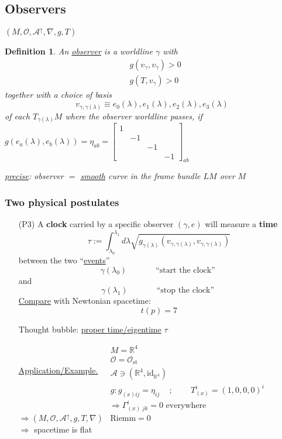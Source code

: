 \documentclass[10pt, twoside]{amsart}
\newtheorem{definition}{Definition}
\begin{document}
\begin{multicols*}{2}
\subsection{Observers} $(M,\mathcal{O}, \mathcal{A}^{\uparrow},\nabla ,g, T)$
\begin{definition}
  An \underline{observer} is a worldline $\gamma$ with
\[
\begin{aligned}
  & g(v_{\gamma}, v_{\gamma}) >  0 \\ 
  & g(T,v_{\gamma}) > 0 
\end{aligned}
\]
together with a choice of basis
\[
v_{\gamma,\gamma(\lambda)} \equiv e_0(\lambda) , e_1(\lambda), e_2(\lambda), e_3(\lambda)
\]
of each $T_{\gamma(\lambda)}M$ where the observer worldline passes, if $g(e_a(\lambda), e_b(\lambda)) = \eta_{ab} = \left[ \begin{matrix} 1 & & & \\ & -1 & & \\ & & -1 & \\ & & & -1 \end{matrix} \right]_{ab}$

\underline{precise}: observer $=$ \underline{smooth} curve in the frame bundle $LM$ over $M$
\end{definition}

\subsubsection{Two physical postulates}

\begin{enumerate}
  \item[(P3)] A \textbf{clock} carried by a specific observer $(\gamma, e)$ will measure a \textbf{time}
\[
\tau := \int_{\lambda_0}^{\lambda_1} d\lambda \sqrt{ g_{\gamma(\lambda)}(v_{\gamma,\gamma(\lambda)}, v_{\gamma,\gamma(\lambda)}) }
\]
between the two ``\underline{events}''
\[
\gamma(\lambda_0) \quad \quad \quad \, \text{ ``start the clock'' }
\]
and 
\[
\gamma(\lambda_1) \quad \quad \quad \, \text{ ``stop the clock'' }
\]
\underline{Compare} with Newtonian spacetime:
\[
t(p)=7
\]

Thought bubble: \underline{proper time/eigentime} $\tau$

\underline{Application/Example.}
$\begin{aligned}
& M = \mathbb{R}^4 \\ 
 & \mathcal{O} = \mathcal{O}_{\text{st}} \\
  & \mathcal{A} \ni (\mathbb{R}^4, \text{id}_{\mathbb{R}^4} ) \\ 
  & g : g_{(x)ij} = \eta_{ij} \quad \, ; \quad \quad \, T_{(x)}^i =(1,0,0,0)^i
\end{aligned}
$
\[
\Longrightarrow \Gamma_{(x) \, \, jk }^i = 0 \text{ everywhere }
\]
$\Longrightarrow (M,\mathcal{O}, \mathcal{A}^{\uparrow},g,T,\nabla)$ \quad \, $\text{Riemm}=0$ \\
$\Longrightarrow $ spacetime is flat


\end{enumerate}
\end{multicols*}
\end{document}
